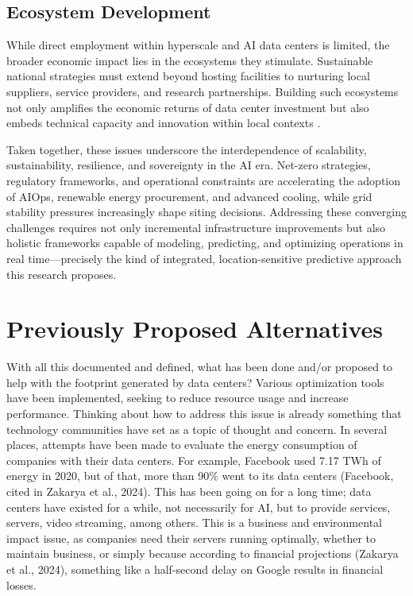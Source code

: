 \documentclass[conference]{IEEEtran}
\begin{document}
\subsection{Ecosystem Development}

While direct employment within hyperscale and AI data centers is limited, the broader economic impact lies in the ecosystems they stimulate. Sustainable national strategies must extend beyond hosting facilities to nurturing local suppliers, service providers, and research partnerships. Building such ecosystems not only amplifies the economic returns of data center investment but also embeds technical capacity and innovation within local contexts \cite{Cruzes2026}.

Taken together, these issues underscore the interdependence of scalability, sustainability, resilience, and sovereignty in the AI era. Net-zero strategies, regulatory frameworks, and operational constraints are accelerating the adoption of AIOps, renewable energy procurement, and advanced cooling, while grid stability pressures increasingly shape siting decisions. Addressing these converging challenges requires not only incremental infrastructure improvements but also holistic frameworks capable of modeling, predicting, and optimizing operations in real time---precisely the kind of integrated, location-sensitive predictive approach this research proposes.

\section{Previously Proposed Alternatives}

With all this documented and defined, what has been done and/or proposed to help with the footprint generated by data centers? Various optimization tools have been implemented, seeking to reduce resource usage and increase performance. Thinking about how to address this issue is already something that technology communities have set as a topic of thought and concern. In several places, attempts have been made to evaluate the energy consumption of companies with their data centers. For example, Facebook used 7.17 TWh of energy in 2020, but of that, more than 90\% went to its data centers (Facebook, cited in Zakarya et al., 2024). This has been going on for a long time; data centers have existed for a while, not necessarily for AI, but to provide services, servers, video streaming, among others. This is a business and environmental impact issue, as companies need their servers running optimally, whether to maintain business, or simply because according to financial projections (Zakarya et al., 2024), something like a half-second delay on Google results in financial losses.
\end{document}
